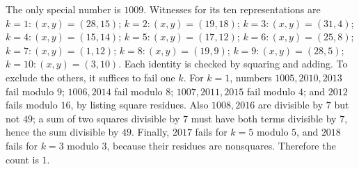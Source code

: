 The only special number is $1009$. Witnesses for its ten representations are $k=1: (x,y)=(28,15)$; $k=2: (x,y)=(19,18)$; $k=3: (x,y)=(31,4)$; $k=4: (x,y)=(15,14)$; $k=5: (x,y)=(17,12)$; $k=6: (x,y)=(25,8)$; $k=7: (x,y)=(1,12)$; $k=8: (x,y)=(19,9)$; $k=9: (x,y)=(28,5)$; $k=10: (x,y)=(3,10)$. Each identity is checked by squaring and adding. To exclude the others, it suffices to fail one $k$. For $k=1$, numbers $1005,2010,2013$ fail modulo $9$; $1006,2014$ fail modulo $8$; $1007,2011,2015$ fail modulo $4$; and $2012$ fails modulo $16$, by listing square residues. Also $1008,2016$ are divisible by $7$ but not $49$; a sum of two squares divisible by $7$ must have both terms divisible by $7$, hence the sum divisible by $49$. Finally, $2017$ fails for $k=5$ modulo $5$, and $2018$ fails for $k=3$ modulo $3$, because their residues are nonsquares. Therefore the count is $\boxed1$.

